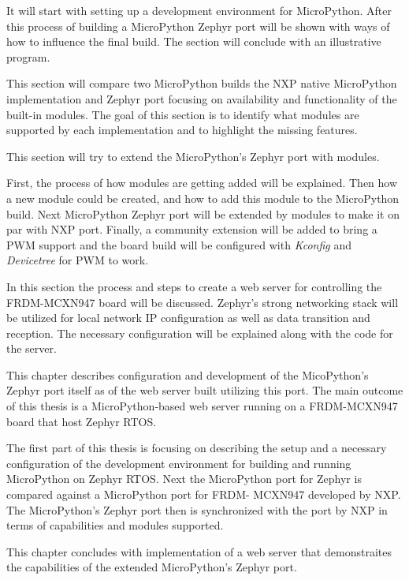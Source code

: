 \documentclass[twoside, 12pt]{article}
\begin{document}
It will start with setting up a development environment for MicroPython. After this process 
of building a MicroPython Zephyr port will be shown with ways of how to influence the final 
build. The section will conclude with an illustrative program.

This section will compare two MicroPython builds the NXP native MicroPython implementation 
and Zephyr port focusing on availability and functionality of the built-in modules. The 
goal of this  section is to identify what modules are supported by each implementation and to 
highlight the missing features.

This section will try to extend the MicroPython's Zephyr port with modules. 

First, the process of how modules are getting added will be explained. Then how a new module
could be created, and how to add this module to the MicroPython build. Next MicroPython 
Zephyr port will be extended by modules to make it on par with NXP port. Finally, a community 
extension will be added to bring a PWM support and the board build will be configured with 
\textit{Kconfig} and \textit{Devicetree} for PWM to work.

In this section the process and steps to create a web server for controlling the
FRDM-MCXN947 board will be discussed. Zephyr's strong networking stack will be utilized for 
local network IP configuration as well as data transition and reception. The necessary 
configuration will be explained along with the code for the server.

This chapter describes configuration and development of the MicoPython's Zephyr port itself 
as of the web server built utilizing this port. The main outcome of this thesis is a MicroPython-based web server running on a FRDM-MCXN947 board that host Zephyr RTOS.

The first part of this thesis is focusing on describing the setup and a necessary 
configuration of the development environment for building and running MicroPython on Zephyr 
RTOS. Next the MicroPython port for Zephyr is compared against a MicroPython port for FRDM-
MCXN947  developed by NXP. The MicroPython's Zephyr port then is synchronized with the port 
by NXP in terms of capabilities and modules supported.

This chapter concludes with implementation of a web server that demonstraites the capabilities of the extended MicroPython's Zephyr port.
\end{document}
